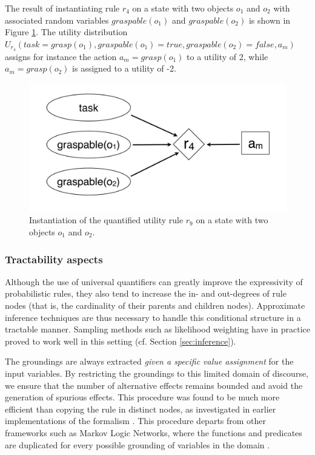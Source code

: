 The result of instantiating rule $r_4$ on a state with two objects $o_1$ and $o_2$ with associated random variables $\mathit{graspable}(o_1)$ and $\mathit{graspable}(o_2)$ is shown in Figure  \ref{fig:quantinstantitionutil}.  The utility distribution $U_{r_4}(\mathit{task}\!=\!\mathit{grasp}(o_1), \mathit{graspable}(o_1) \!=\!\mathit{true}, \mathit{graspable}(o_2)\!=\!\mathit{false}, a_m)$ assigns for instance the action $a_m\!=\!\mathit{grasp}(o_1)$ to a utility of 2, while $a_m\!=\!\mathit{grasp(o_2)}$ is assigned to a utility of -2. 


\begin{figure}[h]
\centering
\includegraphics[scale=0.25]{imgs/quantutilruleinstantiation.pdf}
\caption{Instantiation of the quantified utility rule $r_9$ on a state with two objects $o_1$ and $o_2$.}
\label{fig:quantinstantitionutil}
\end{figure}

\subsubsection*{Tractability aspects}

Although the use of universal quantifiers can greatly improve the expressivity of probabilistic rules, they also tend to increase the in- and out-degrees of rule nodes (that is, the cardinality of their parents and children nodes). Approximate inference techniques are thus necessary to handle this conditional structure in a tractable manner. Sampling methods such as likelihood weighting have in practice proved to work well in this setting (cf. Section \ref{sec:inference}).

The groundings are always extracted \textit{given a specific value assignment} for the input variables. By restricting the groundings to this limited domain of discourse, we ensure that the number of alternative effects remains bounded and avoid the generation of spurious effects.   This procedure was found to be much more efficient than copying the rule in distinct nodes, as investigated in earlier implementations of the formalism \citep{relational-apl2012}.  This procedure departs from other frameworks such as Markov Logic Networks, where the functions and predicates are duplicated for every possible grounding of variables in the domain \citep{Richardson:2006}.



